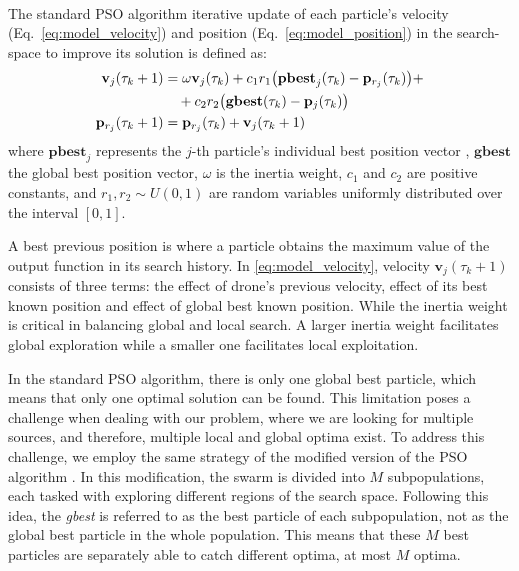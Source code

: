 \noindent
\\
The standard PSO algorithm iterative update of each particle's velocity
(Eq.~\ref{eq:model_velocity}) and position (Eq.~\ref{eq:model_position})
in the search-space to improve its solution is defined as:
\begin{align}
    \mathbf{v}_{j}(\tau_k+1) &= \omega \mathbf{v}_{j}(\tau_k) 
    + c_1 r_1 \big(\mathbf{pbest}_{j}(\tau_k) - \mathbf{p}_{r_j}(\tau_k)\big) + \notag \\
    &\quad + c_2 r_2 \big(\mathbf{gbest}(\tau_k) - \mathbf{p}_{j}(\tau_k)\big) \label{eq:model_velocity} \\
    \mathbf{p}_{r_j}(\tau_k + 1) &= \mathbf{p}_{r_j}(\tau_k) + \mathbf{v}_{j}(\tau_k+1) \label{eq:model_position}
\end{align}
where $\mathbf{pbest}_j$ represents the $j$-th particle's individual best position vector  
, $\mathbf{gbest}$ the global best position vector, $\omega$ is the inertia weight,
$c_1$ and $c_2$ are positive constants, and $r_1, r_2 \sim \textit{U}(0,1)$ are random variables 
uniformly distributed over the interval $[0, 1]$.

A best previous position is where a particle obtains the 
maximum value of the output function in its search
history.
In \ref{eq:model_velocity}, velocity $\mathbf{v}_{j}(\tau_k+1)$ 
consists of three terms: the effect of drone’s previous velocity, 
effect of its best known position and effect of global best
known position.
While the inertia weight is critical in balancing global and local search. 
A larger inertia weight facilitates global exploration while a smaller one
facilitates local exploitation.

In the standard PSO algorithm, there is only one global best particle, 
which means that only one optimal solution can be found. This limitation 
poses a challenge when dealing with our problem, where we are looking for multiple sources, 
and therefore, multiple local and global optima exist. To address this challenge, 
we employ the same strategy of the modified version of the PSO algorithm \cite{PSO_IMPORTANT}. 
In this modification, the swarm is divided into $M$ subpopulations, each tasked with exploring 
different regions of the search space. Following this idea, the \textit{gbest} is referred to as 
the best particle of each subpopulation, not as the global best particle in the whole population. 
This means that these $M$ best particles are separately able to catch different optima, 
at most $M$ optima.

